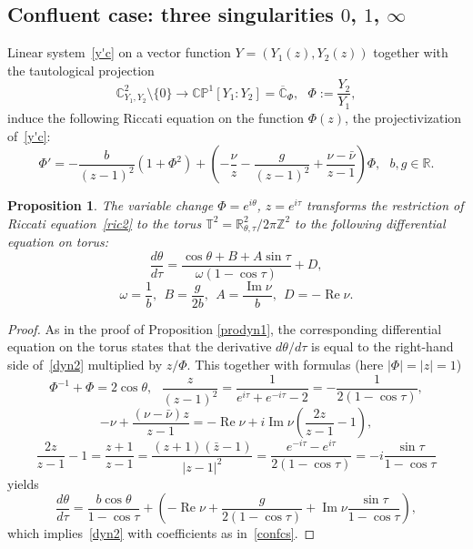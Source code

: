 \documentclass[preprint,12pt]{elsarticle}
\theoremstyle{plain}
\newtheorem{proposition}[theorem]{Proposition}
\DeclareMathOperator{\im}{\mathrm{Im}}
\DeclareMathOperator{\re}{\mathrm{Re}}
\numberwithin{equation}{section}
\numberwithin{equation}{section}
\begin{document}
\subsection[Confluent case: three singularities]{Confluent case: three singularities $0$, $1$, $\infty$}\label{subsec:three-sings}
Linear system~\eqref{y'c} on a vector function $Y=(Y_1(z),Y_2(z))$ together with the tautological projection 
 $$\mathbb{C}^2_{Y_1,Y_2}\setminus\{0\}\to\mathbb{CP}^1[Y_1:Y_2]=\overline{\mathbb{C}}_{\Phi}, \ \ \ \Phi:=\frac{Y_2}{Y_1},$$
 induce the following Riccati equation on the function $\Phi(z)$, the projectivization of~\eqref{y'c}: 
 \begin{equation}\Phi'=-\frac{b}{(z-1)^2}(1+\Phi^2)+\left(-\frac{\nu}{z}-\frac{g}{(z-1)^2}+\frac{\nu-\bar\nu}{z-1}\right)\Phi, \ \  \ b, g\in\mathbb R.\label{ric2}\end{equation}


\begin{proposition} \label{prodyn2} The variable change $\Phi=e^{i\theta}$, $z=e^{i\tau}$ 
 transforms the restriction of Riccati equation~\eqref{ric2} to the  torus $\mathbb{T}^2=\mathbb{R}^2_{\theta,\tau}\slash2\pi\mathbb{Z}^2$ 
 to the following differential equation on torus:
 \begin{equation}\frac{d\theta}{d\tau}=\frac{\cos\theta+B+A\sin\tau}{\omega(1-\cos\tau)}+D,
 \label{dyn2}\end{equation}
 \begin{equation} \omega=\frac1b, \ \ B=\frac{g}{2b}, \ \ A=\frac{\im\nu}{b}, \ \ D=-\re\nu.\label{confcs}
 \end{equation}
 \end{proposition}
 \begin{proof} As in the proof of Proposition \ref{prodyn1}, the corresponding  
 differential equation on the torus states that the derivative ${d\theta}/{d\tau}$ is equal to the right-hand side of~\eqref{dyn2} multiplied by $z/{\Phi}$. This together with formulas (here $|\Phi|=|z|=1$) 
 $$\Phi^{-1}+\Phi=2\cos\theta, \ \ \  \frac z{(z-1)^2}=\frac1{e^{i\tau}+e^{-i\tau}-2}=-\frac1{2(1-\cos\tau)},$$
 $$-\nu+\frac{(\nu-\bar\nu)z}{z-1}=-\re\nu+i\im\nu\left(\frac{2z}{z-1}-1\right),$$ 
 $$\frac{2z}{z-1}-1=\frac{z+1}{z-1}=\frac{(z+1)(\bar z-1)}{|z-1|^2}=\frac{e^{-i\tau}-e^{i\tau}}{2(1-\cos\tau)}=-i\frac{\sin\tau}{1-\cos\tau}$$
 yields
 $$\frac{d\theta}{d\tau}=\frac{b\cos\theta}{1-\cos\tau}+\left(-\re\nu+\frac{g}{2(1-\cos\tau)}+\im\nu\frac{\sin\tau}{1-\cos\tau}\right),$$
 which implies~\eqref{dyn2} with coefficients as in~\eqref{confcs}. 
 \end{proof}
\end{document}
